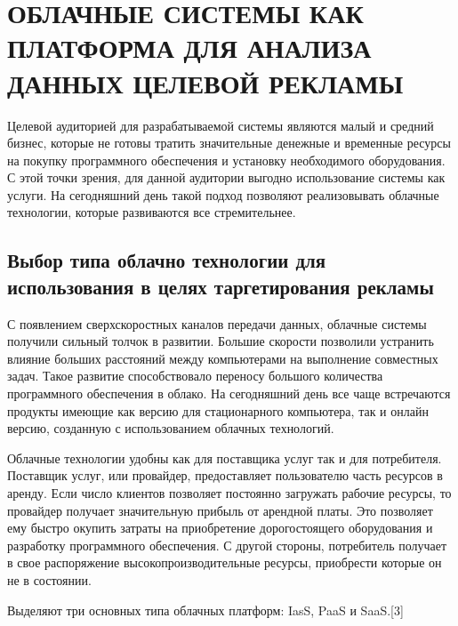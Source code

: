 \chapter{ОБЛАЧНЫЕ СИСТЕМЫ КАК ПЛАТФОРМА ДЛЯ АНАЛИЗА ДАННЫХ ЦЕЛЕВОЙ РЕКЛАМЫ}

Целевой аудиторией для разрабатываемой системы являются малый и средний бизнес, которые не готовы тратить значительные денежные и временные ресурсы на покупку программного обеспечения и установку необходимого оборудования. С этой точки зрения, для данной аудитории выгодно использование системы как услуги. На сегодняшний день такой подход позволяют реализовывать облачные технологии, которые развиваются все стремительнее.

\section{Выбор типа облачно технологии для использования в целях таргетирования рекламы}

С появлением сверхскоростных каналов передачи данных, облачные системы получили сильный толчок в развитии. Большие скорости позволили устранить влияние больших расстояний между компьютерами на выполнение совместных задач. Такое развитие способствовало переносу большого количества программного обеспечения в облако. На сегодняшний день все чаще встречаются продукты имеющие как версию для стационарного компьютера, так и онлайн версию, созданную с использованием облачных технологий.

Облачные технологии удобны как для поставщика услуг так и для потребителя. Поставщик услуг, или провайдер, предоставляет пользователю часть ресурсов в аренду. Если число клиентов позволяет постоянно загружать рабочие ресурсы, то провайдер получает значительную прибыль от арендной платы. Это позволяет ему быстро окупить затраты на приобретение дорогостоящего оборудования и разработку программного обеспечения.
С другой стороны, потребитель получает в свое распоряжение высокопроизводительные ресурсы, приобрести которые он не в состоянии. 

Выделяют три основных типа облачных платформ: IasS, PaaS и SaaS.[3]

